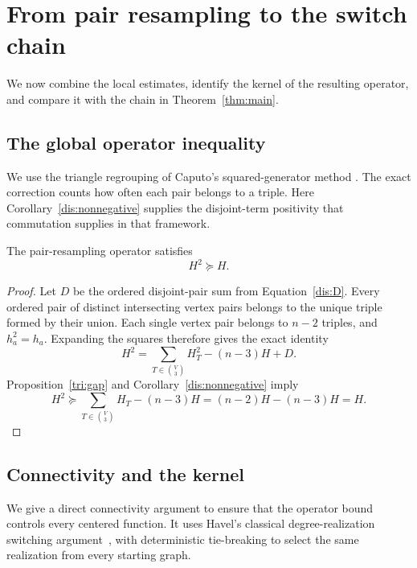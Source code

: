 \section{From pair resampling to the switch chain}
\label{mix:section}

We now combine the local estimates, identify the kernel of the resulting
operator, and compare it with the chain in Theorem~\ref{thm:main}.

\subsection{The global operator inequality}

We use the triangle regrouping of Caputo's squared-generator method
\cite[Section~1.1, Equations~(1.13)--(1.15)]{Caputo08}.
The exact correction counts how often each pair belongs to a triple.
Here Corollary~\ref{dis:nonnegative} supplies the disjoint-term
positivity that commutation supplies in that framework.

\begin{proposition}\label{mix:global}
The pair-resampling operator satisfies
\begin{equation}\label{mix:H-square}
H^2\succeq H.
\end{equation}
\end{proposition}

\begin{proof}
Let $D$ be the ordered disjoint-pair sum from
Equation~\eqref{dis:D}. Every ordered pair of distinct intersecting vertex
pairs belongs to the unique triple formed by their union. Each single
vertex pair belongs to $n-2$ triples, and $h_a^2=h_a$. Expanding the
squares therefore gives the exact identity
\begin{equation}\label{mix:expansion}
H^2=\sum_{T\in\binom V3} H_T^2-(n-3)H+D.
\end{equation}
Proposition~\ref{tri:gap} and Corollary~\ref{dis:nonnegative} imply
\[
H^2\succeq\sum_{T\in\binom V3}H_T-(n-3)H
=(n-2)H-(n-3)H=H.
\]
\end{proof}

\subsection{Connectivity and the kernel}

We give a direct connectivity argument to ensure that the operator bound
controls every centered function. It uses Havel's classical
degree-realization switching argument~\cite[Theorem~3]{Havel55},
with deterministic tie-breaking to select the same realization from
every starting graph.

